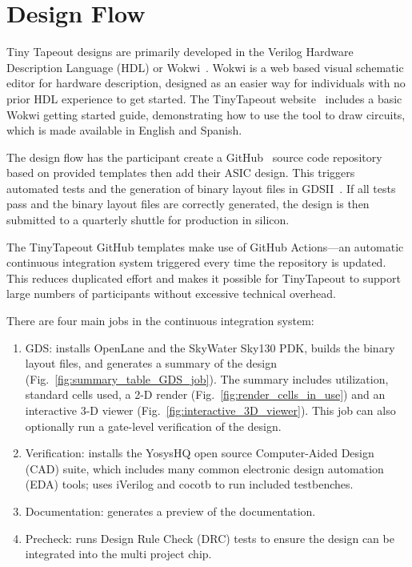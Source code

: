 \section{Design Flow}
\label{sec:design_flow}

Tiny Tapeout designs are primarily developed in the Verilog Hardware Description Language (HDL) or Wokwi~\cite{wokwi}.
Wokwi is a web based visual schematic editor for hardware description, designed as an easier way for individuals with no prior HDL experience to get started.
The TinyTapeout website~\cite{tinytapeout} includes a basic Wokwi getting started guide, demonstrating how to use the tool to draw circuits, which is made available in English and Spanish.

The design flow has the participant create a GitHub~\cite{github} source code repository based on provided templates then add their ASIC design. This triggers automated tests and the generation of binary layout files in GDSII~\cite{gds}. If all tests pass and the binary layout files are correctly generated, the design is then submitted to a quarterly shuttle for production in silicon.

The TinyTapeout GitHub templates\cite{verilogtemplate} make use of GitHub Actions\cite{githubactions}---an automatic continuous integration system triggered every time the repository is updated. This reduces duplicated effort and makes it possible for TinyTapeout to support large numbers of participants without excessive technical overhead.

There are four main jobs in the continuous integration system:

\begin{enumerate}
	\item GDS: installs OpenLane\cite{openlane} and the SkyWater Sky130\cite{skywaterpdk} PDK, builds the binary layout files, and generates a summary of the design (Fig.~\ref{fig:summary_table_GDS_job}). The summary includes utilization, standard cells used, a 2-D render (Fig.~\ref{fig:render_cells_in_use}) and an interactive 3-D viewer (Fig.~\ref{fig:interactive_3D_viewer}).
This job can also optionally run a gate-level verification of the design.
	\item Verification: installs the YosysHQ open source Computer-Aided Design (CAD) suite, which includes many common electronic design automation (EDA) tools; uses iVerilog\cite{iverilog} and cocotb\cite{cocotb} to run included testbenches.
	\item Documentation: generates a preview of the documentation.
	\item Precheck: runs Design Rule Check (DRC) tests to ensure the design can be integrated into the multi project chip.
\end{enumerate}

